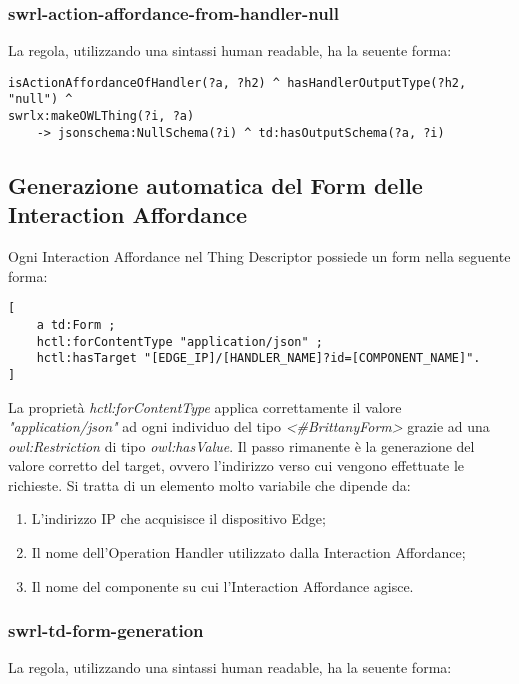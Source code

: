 \subsubsection{swrl-action-affordance-from-handler-null}
La regola, utilizzando una sintassi human readable, ha la seuente forma:
\begin{verbatim}
isActionAffordanceOfHandler(?a, ?h2) ^ hasHandlerOutputType(?h2, "null") ^
swrlx:makeOWLThing(?i, ?a)
	-> jsonschema:NullSchema(?i) ^ td:hasOutputSchema(?a, ?i)
\end{verbatim}

\subsection{Generazione automatica del Form delle Interaction Affordance}
Ogni Interaction Affordance nel Thing Descriptor possiede un form nella seguente forma:
\begin{verbatim}
[
	a td:Form ;
	hctl:forContentType "application/json" ;
	hctl:hasTarget "[EDGE_IP]/[HANDLER_NAME]?id=[COMPONENT_NAME]".
]
\end{verbatim}
La proprietà \textit{hctl:forContentType} applica correttamente il valore \textit{"application/json"} ad ogni individuo del tipo \textit{<\#BrittanyForm>} grazie ad una \textit{owl:Restriction} di tipo \textit{owl:hasValue}.\newline
\noindent Il passo rimanente è la generazione del valore corretto del target, ovvero l'indirizzo verso cui vengono effettuate le richieste. Si tratta di un elemento molto variabile che dipende da:
\begin{enumerate}
	\item L'indirizzo IP che acquisisce il dispositivo Edge;
	\item Il nome dell'Operation Handler utilizzato dalla Interaction Affordance;
	\item Il nome del componente su cui l'Interaction Affordance agisce.
\end{enumerate}

\subsubsection{swrl-td-form-generation}
La regola, utilizzando una sintassi human readable, ha la seuente forma:

